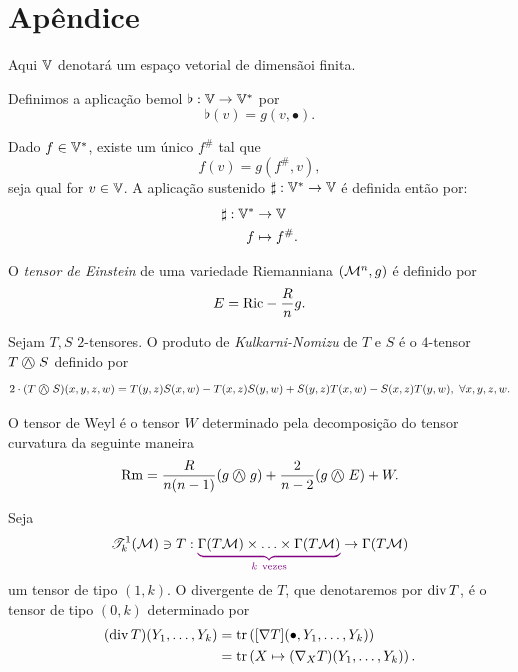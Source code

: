       \section{Apêndice}

\begin{oobs}
Aqui $\mathbb{V}$ denotará um espaço vetorial de dimensãoi finita.
\end{oobs}

\begin{deff}\label{DefinicaoDoBemol}
  Definimos a aplicação bemol $\flat: \mathbb{V} \to \mathbb{V}^{\ast}$ por $$\flat(v) = g(v, \bullet).$$
  \end{deff} 
\begin{deff}
  Dado $f \in \mathbb{V}^{\ast}$, existe um único $f^{\#}$ tal que $$f(v) = g\left(f^{\#}, v\right),$$ seja qual for $v \in \mathbb{V}$. A aplicação sustenido $\sharp: \mathbb{V}^{\ast} \to \mathbb{V}$ é definida então por:
  \begin{align*}
  \sharp: \mathbb{V}^{\ast} &\to \mathbb{V} \\
  f &\mapsto f^{\#}.
  \end{align*}
  \end{deff}
  
\begin{deff}
  O \textit{tensor de Einstein} de uma variedade Riemanniana $\left(\mathcal{M}^n, g \right)$ é definido por
  $$E= \mathrm{Ric} - \frac{R}{n} g.$$
  \end{deff}

\begin{deff}\label{DefKulNomizu}
  Sejam $T, S$ $2$-tensores. O produto de \textit{Kulkarni-Nomizu} de $T$ e $S$ é o $4$-tensor $T \mathbin{\bigcirc\mspace{-15mu}\wedge\mspace{4mu}} S$ definido por
  $$2 \cdot (T \mathbin{\bigcirc\mspace{-15mu}\wedge\mspace{4mu}} S)(x, y, z, w) = T(y, z) S(x, w) - T(x, z) S(y, w)  + S(y, z) T(x, w) - S(x, z) T(y, w), \ \forall x,y, z, w.$$
  \end{deff}

  \begin{deff}\label{DefWeyl}
  O tensor de Weyl é o tensor $W$ determinado pela decomposição do tensor curvatura da seguinte maneira
  $$\mathrm{Rm} = \frac{R}{n(n-1)} (g \mathbin{\bigcirc\mspace{-15mu}\wedge\mspace{4mu}} g) + \frac{2}{n-2} (g \mathbin{\bigcirc\mspace{-15mu}\wedge\mspace{4mu}} E) + W.$$ 
  \end{deff}

  \begin{deff}\label{divergenteDeT}
    Seja 
    \[
    \T^{1}_{k}(\mm) \ni T: \Munderbrace{\Gamma(T\mm) \times \ldots \times \Gamma(T \mm)}{k \ \text{vezes}} \to \Gamma(T \mm)
    \]
    um tensor de tipo $(1, k)$. O divergente de $T$, que denotaremos por $\operatorname{div} T$, é o tensor de tipo $(0, k)$ determinado por
    \[\begin{aligned}
    (\operatorname{div} T)(Y_1, \ldots, Y_k) &= \operatorname{tr}\left( [\nabla T](\bullet, Y_1, \ldots, Y_k) \right) \\ 
    &= \operatorname{tr}\left(X \mapsto (\nabla_X T)(Y_1, \ldots, Y_k) \right).
    \end{aligned} 
    \]
    \end{deff}

